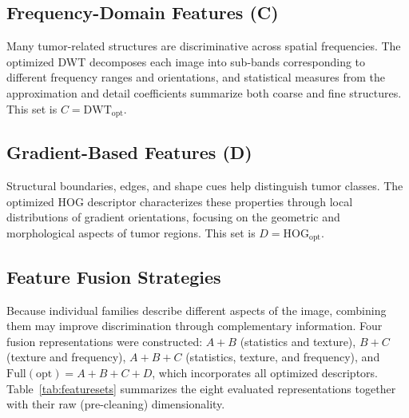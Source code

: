\subsection{Frequency-Domain Features (C)}
\label{sec:feat_dwt}

Many tumor-related structures are discriminative across spatial frequencies. The
optimized DWT decomposes each image into sub-bands corresponding to different
frequency ranges and orientations, and statistical measures from the
approximation and detail coefficients summarize both coarse and fine structures.
This set is $C = \mathrm{DWT_{opt}}$.

\subsection{Gradient-Based Features (D)}
\label{sec:feat_hog}

Structural boundaries, edges, and shape cues help distinguish tumor classes. The
optimized HOG descriptor characterizes these properties through local
distributions of gradient orientations, focusing on the geometric and
morphological aspects of tumor regions. This set is $D = \mathrm{HOG_{opt}}$.

\subsection{Feature Fusion Strategies}
\label{sec:feat_sets}

Because individual families describe different aspects of the image, combining
them may improve discrimination through complementary information. Four fusion
representations were constructed: $A{+}B$ (statistics and texture), $B{+}C$
(texture and frequency), $A{+}B{+}C$ (statistics, texture, and frequency), and
$\mathrm{Full(opt)} = A{+}B{+}C{+}D$, which incorporates all optimized
descriptors. Table~\ref{tab:featuresets} summarizes the eight evaluated
representations together with their raw (pre-cleaning) dimensionality.

